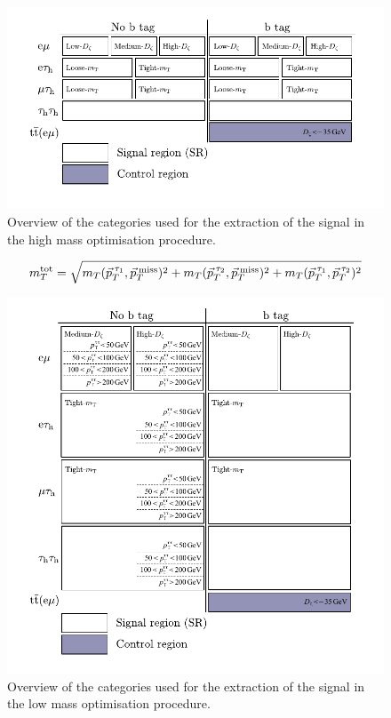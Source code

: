 \begin{figure}[!hbtp]
\centering
    \includegraphics[width=1.0\textwidth]{Figures/high_mass_categories.pdf}
\caption{Overview of the categories used for the extraction of the signal in the high mass optimisation procedure.}
\label{fig:high_mass_categories}
\end{figure}

\begin{equation}
m_{T}^\text{tot} = \sqrt{m_{T}(\vec{p}_{T}^{\hspace{2pt}\tau_1},\vec{p}_{T}^{\hspace{2pt}\text{miss}})^2 +  m_{T}(\vec{p}_{T}^{\hspace{2pt}\tau_2},\vec{p}_{T}^{\hspace{2pt}\text{miss}})^2 + m_{T}(\vec{p}_{T}^{\hspace{2pt}\tau_1},\vec{p}_{T}^{\hspace{2pt}\tau_2})^2}
\end{equation}

\begin{figure}[!hbtp]
\centering
    \includegraphics[width=1.0\textwidth]{Figures/low_mass_categories.pdf}
\caption{Overview of the categories used for the extraction of the signal in the low mass optimisation procedure.}
\label{fig:low_mass_categories}
\end{figure}

